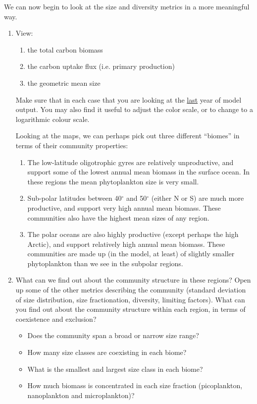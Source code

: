 We can now begin to look at the size and diversity metrics  in a more meaningful way.

\begin{enumerate}[noitemsep]
\vspace{1mm}
\item View:
\vspace{1mm}
\begin{enumerate}[noitemsep]
\item the total carbon biomass
\item the carbon uptake flux (i.e. primary production)
\item the geometric mean size
\end{enumerate}
\vspace{1mm}
Make sure that in each case that you are looking at the \uline{last} year of model output. You may also find it useful to adjust the color scale, or to change to a logarithmic colour scale.

\vspace{1mm}
Looking at the maps, we can perhaps pick out three different ``biomes'' in terms of their community properties:
\vspace{1mm}
\begin{enumerate}
\item The low-latitude oligotrophic gyres are relatively unproductive, and support some of the lowest annual mean biomass in the surface ocean. In these regions the mean phytoplankton size is very small.
\item Sub-polar latitudes between 40$^\circ$ and 50$^\circ$ (either N or S) are much more productive, and support very high annual mean biomass. These communities also have the highest mean sizes of any region.
\item The polar oceans are also highly productive (except perhaps the high Arctic), and support relatively high annual mean biomass. These communities are made up (in the model, at least) of slightly smaller phytoplankton than we see in the subpolar regions.
\end{enumerate}

\newpage
%
\vspace{1mm}
\item What can we find out about the community structure in these regions? Open up some of the other metrics describing the community (standard deviation of size distribution, size fractionation, diversity, limiting factors). What can you find out about the community structure within each region, in terms of coexistence and exclusion?
\vspace{1mm}
\begin{itemize}
\item Does the community span a broad or narrow size range?
\item How many size classes are coexisting in each biome?
\item What is the smallest and largest size class in each biome?
\item How much biomass is concentrated in each size fraction (picoplankton, nanoplankton and microplankton)?
\end{itemize}
\end{enumerate}
